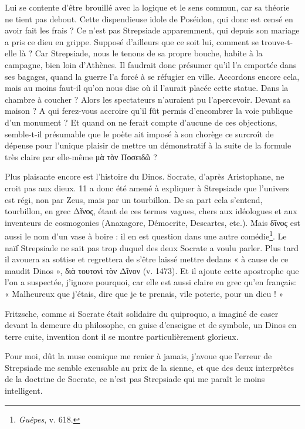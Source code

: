\documentclass{book}%
\newcommand{\italique}[1]{\textit{#1}}%
\newcommand{\note}[1]{\footnote{#1}}
\begin{document}
Lui se contente d'être brouillé avec la logique et le sens commun, car sa théorie ne tient pas debout. Cette dispendieuse idole de Poséidon, qui donc est censé en avoir fait les frais ? Ce n'est pas Strepsiade apparemment, qui depuis son mariage a pris ce dieu en grippe. 
Supposé d'ailleurs que ce soit lui, comment se trouve-t-elle là ? Car Strepsiade, nous le tenons de sa propre bouche, habite à la campagne, bien loin d'Athènes. Il faudrait donc présumer qu'il l'a emportée dans ses bagages, quand la guerre l'a forcé à se réfugier en ville. Accordons encore cela, mais au moins faut-il qu'on nous dise où il l'aurait placée cette statue. Dans la chambre à coucher ? Alors les spectateurs n'auraient pu l'apercevoir. Devant sa maison ? A qui ferez-vous accroire qu'il fût permis d'encombrer la voie publique d'un monument ? Et quand on ne ferait compte d'aucune de ces objections, semble-t-il présumable que le poète ait imposé à son chorège ce surcroît de dépense pour l'unique plaisir de mettre un démonstratif à la suite de la formule très claire par elle-même μὰ τὸν Ποσειδῶ ? 

Plus plaisante encore est l'histoire du Dinos. Socrate, d'après Aristophane, ne croit pas aux dieux. 11 a donc été amené à expliquer à Strepsiade que l'univers est régi, non par Zeus, mais par un tourbillon. De sa part cela s'entend, tourbillon, en grec Δῖνος, étant de ces termes vagues, chers aux idéologues et aux inventeurs de cosmogonies (Anaxagore, Démocrite, Descartes, etc.). Mais δῖνος est aussi le nom d'un vase à boire : il en est question dans une autre comédie\note{\italique{Guêpes}, v. 618.}. Le naïf Strepsiade ne sait pas trop duquel des deux Socrate a voulu parler. Plus tard il avouera sa sottise et regrettera de s'être laissé mettre dedans « à cause de ce maudit Dinos », διὰ τουτονὶ τὸν Δῖνον (v. 1473). Et il ajoute cette apostrophe que l'on a suspectée, j'ignore pourquoi, car elle est aussi claire en grec qu'en français: « Malheureux que j'étais, dire que je te prenais, vile poterie, pour un dieu ! » 

Fritzsche, comme si Socrate était solidaire du quiproquo, a imaginé de caser devant la demeure du philosophe, en guise d'enseigne et de symbole, un Dinos en terre cuite, invention dont il se montre particulièrement glorieux. 

Pour moi, dût la muse comique me renier à jamais, j'avoue que l'erreur de Strepsiade me semble excusable au prix de la sienne, et que des deux interprètes de la doctrine de Socrate, ce n'est pas Strepsiade qui me paraît le moins intelligent. 
\end{document}
